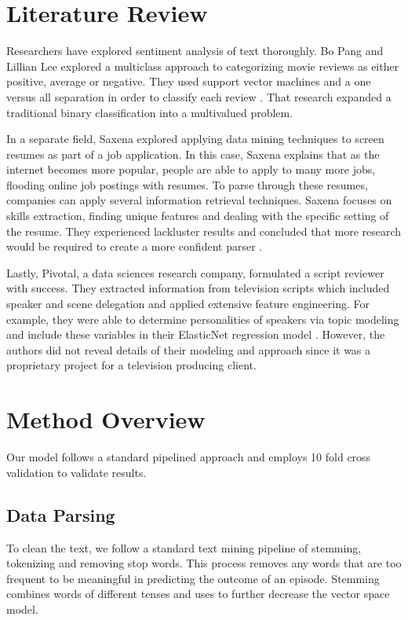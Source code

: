 \documentclass{sig-alternate-05-2015}
\begin{document}
\section{Literature Review} %

Researchers have explored sentiment analysis of text thoroughly. Bo Pang and Lillian Lee explored a multiclass approach to categorizing movie reviews as either positive, average or negative. They used support vector machines and a one versus all separation in order to classify each review \cite{Pang:2005:SSE:1219840.1219855}. That research expanded a traditional binary classification into a multivalued problem. 

In a separate field, Saxena explored applying data mining techniques to screen resumes as part of a job application. In this case, Saxena explains that as the internet becomes more popular, people are able to apply to many more jobs, flooding online job postings with resumes. To parse through these resumes, companies can apply several information retrieval techniques. Saxena focuses on skills extraction, finding unique features and dealing with the specific setting of the resume. They experienced lackluster results and concluded that more research would be required to create a more confident parser \cite{Charul}.

Lastly, Pivotal, a data sciences research company, formulated a script reviewer with success. They extracted information from television scripts which included speaker and scene delegation and applied extensive feature engineering. For example, they were able to determine personalities of speakers via topic modeling and include these variables in their ElasticNet regression model \cite{Pivotal}. However, the authors did not reveal details of their modeling and approach since it was a proprietary project for a television producing client.  

\hfill \break
\section{Method Overview}
Our model follows a standard pipelined approach and employs 10 fold cross validation to validate results.

\subsection{Data Parsing}
To clean the text, we follow a standard text mining pipeline of stemming, tokenizing and removing stop words. This process removes any words that are too frequent to be meaningful in predicting the outcome of an episode. Stemming combines words of different tenses and uses to further decrease the vector space model.
\end{document}
